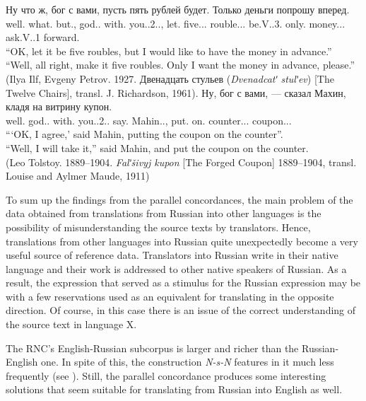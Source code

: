\documentclass[output=paper]{langscibook}
\begin{document}
\ea\label{ex:mikhailov:16}
\ea\label{ex:mikhailov:16a}
\gll  Ну что ж, бог с вами, пусть пять рублей будет. Только деньги попрошу вперед.\\
     well.{\PTCP} what.{\PRON} but.{\PTCP}, god.{\NOUN}.{\NOM} with.{\PREP} you.{\PRON}.2.{\INSTR}.{\PL}, let.{\PTCP} five.{\NOUN}.{\NUM}.{\NOM} rouble.{\NOUN}.{\GEN}.{\PL} be.V.{\FUT}.3{\SG}. only.{\ADV} money.{\NOUN}.{\ACC}.{\PL} ask.V.{\FUT}.1{\SG} forward.{\ADV}\\
\glt  “OK, let it be five roubles, but I would like to have the money in advance.”\\
    “Well, all right, make it five roubles. Only I want the money in advance, please.” \\
 (Ilya Ilf, Evgeny Petrov. 1927. {Двенадцать стульев (\textit{Dvenadcatʹ stulʹev}) [The Twelve Chairs], transl. J. Richardson, 1961).}
\ex\label{ex:mikhailov:16b}
\gll  Ну, бог с вами, --- сказал Махин, кладя на витрину купон.\\
     well.{\PTCP} god.{\NOUN}.{\NOM} with.{\PREP} you.{\PRON}.2.{\INSTR}.{\PL} say.{\PAST} Mahin.{\NOUNPROPER}.{\NOM}, put.{\GERUND} on.{\PREP} counter.{\NOUN}.{\ACC}.{\SG} coupon.{\NOUN}.{\ACC}.{\SG}\\
\glt      “‘OK, I agree,’ said Mahin, putting the coupon on the counter”.\\
 “Well, I will take it,” said Mahin, and put the coupon on the counter.\\
(Leo Tolstoy. 1889--1904. \textit{Falʹšivyj kupon} [The Forged Coupon] 1889--1904, transl. Louise and Aylmer Maude, 1911)
\z
\z

To sum up the findings from the parallel concordances, the main problem of the data obtained from translations from Russian into other languages is the possibility of misunderstanding the source texts by translators. Hence, translations from other languages into Russian quite unexpectedly become a very useful source of reference data. Translators into Russian write in their native language and their work is addressed to other native speakers of Russian. As a result, the expression that served as a stimulus for the Russian expression may be with a few reservations used as an equivalent for translating in the opposite direction. Of course, in this case there is an issue of the correct understanding of the source text in language X.

The RNC’s English-Russian subcorpus is larger and richer than the Russian-English one. In spite of this, the construction \textit{N-s-N} features in it much less frequently (see ). Still, the parallel concordance produces some interesting solutions that seem suitable for translating from Russian into English as well.
\end{document}
